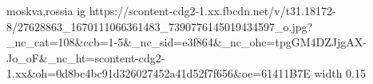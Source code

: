  
 
 
 
 

\par
moskva,rossia
\ifcmt
  ig https://scontent-cdg2-1.xx.fbcdn.net/v/t31.18172-8/27628863_1670111066361483_7390776145019434597_o.jpg?_nc_cat=108&ccb=1-5&_nc_sid=e3f864&_nc_ohc=tpgGM4DZJjgAX-Jo_oF&_nc_ht=scontent-cdg2-1.xx&oh=0d8bc4bc91d326027452a41d52f7f656&oe=61411B7E
  width 0.15
\fi

